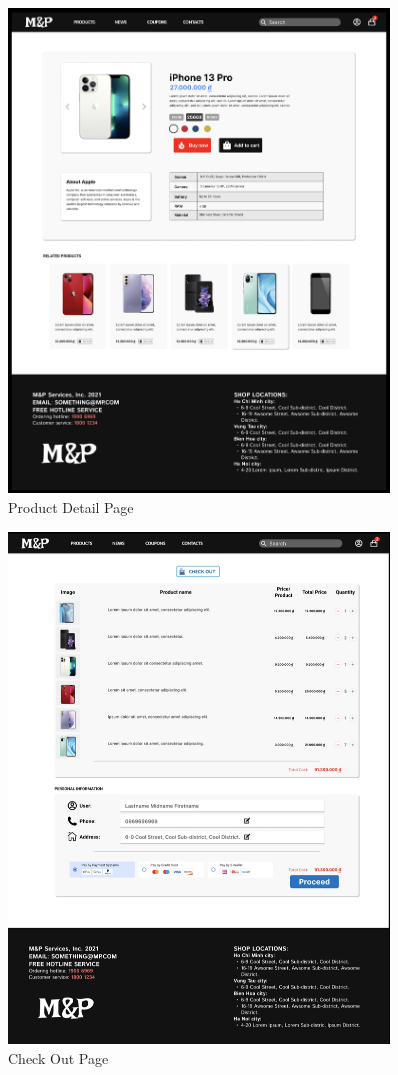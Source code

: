 \documentclass[a4paper]{article}
\numberwithin{equation}{section}
\begin{document}
\begin{figure}
  \centering
  \includegraphics[width=0.9\textwidth]{assets/p2/p3.png}
  \caption{Product Detail Page}
\end{figure}

\begin{figure}
  \centering
  \includegraphics[width=0.9\textwidth]{assets/p2/p4.png}
  \caption{Check Out Page}
\end{figure}
\end{document}
